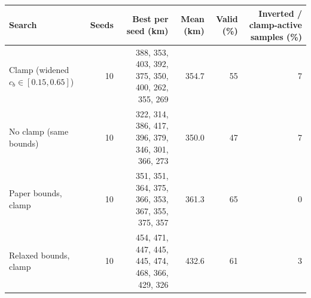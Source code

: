 \begin{tabular}{@{}lrrrrr@{}}
\toprule
Search & Seeds & Best per seed (km) & Mean (km) & Valid (\%) & Inverted / clamp-active samples (\%) \\
\midrule
Clamp (widened $c_b\in[0.15,0.65]$) & 10 & 388, 353, 403, 392, 375, 350, 400, 262, 355, 269 & 354.7 & 55 & 7 \\
No clamp (same bounds) & 10 & 322, 314, 386, 417, 396, 379, 346, 301, 366, 273 & 350.0 & 47 & 7 \\
Paper bounds, clamp & 10 & 351, 351, 364, 375, 366, 353, 367, 355, 375, 357 & 361.3 & 65 & 0 \\
Relaxed bounds, clamp & 10 & 454, 471, 447, 445, 445, 474, 468, 366, 429, 326 & 432.6 & 61 & 3 \\
\bottomrule
\end{tabular}
